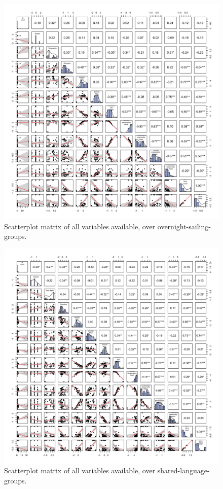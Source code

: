\documentclass[12pt,letterpaper]{article}
\begin{document}
\begin{figure}[ht]
\includegraphics[width=15cm]{latex/SPLOM_SBZR_all_variables.png}
\caption{Scatterplot matrix of all variables available, over overnight-sailing-groups.}
\label{SPLOM_SBZR_all_variables}
\end{figure}

\begin{figure}[ht]
\includegraphics[width=15cm]{latex/SPLOM_medium_all_variables.png}
\caption{Scatterplot matrix of all variables available, over shared-language-groups.}
\label{SPLOM_medium_all_variables}
\end{figure}
\end{document}
